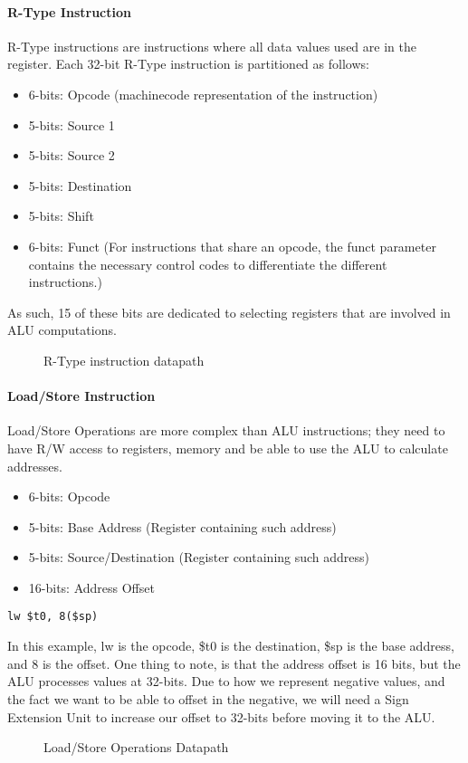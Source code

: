 \paragraph{R-Type Instruction}
R-Type instructions are instructions where all data values used are in the register. Each 32-bit R-Type instruction is partitioned as follows:
\begin{itemize}
	\item 6-bits: Opcode (machinecode representation of the instruction)
	\item 5-bits: Source 1
	\item 5-bits: Source 2
	\item 5-bits: Destination
	\item 5-bits: Shift
	\item 6-bits: Funct (For instructions that share an opcode, the funct parameter contains the necessary control codes to differentiate the different instructions.)
\end{itemize}
As such, 15 of these bits are dedicated to selecting registers that are involved in ALU computations.
\begin{figure}[!htb]
	\caption{\label{fig:rtype} R-Type instruction datapath}
\end{figure}
\newpage
\paragraph{Load/Store Instruction}
Load/Store Operations are more complex than ALU instructions; they need to have R/W access to registers, memory and be able to use the ALU to calculate addresses.
\begin{itemize}
	\item 6-bits: Opcode
	\item 5-bits: Base Address (Register containing such address)
	\item 5-bits: Source/Destination (Register containing such address)
	\item 16-bits: Address Offset
\end{itemize}
\begin{verbatim}
lw $t0, 8($sp)
\end{verbatim}
In this example, lw is the opcode, \$t0 is the destination, \$sp is the base address, and 8 is the offset.
One thing to note, is that the address offset is 16 bits, but the ALU processes values at 32-bits. Due to how we represent negative values, and the fact we want to be able to offset in the negative, we will need a Sign Extension Unit to increase our offset to 32-bits before moving it to the ALU.
\begin{figure}[!htb]
	\caption{\label{fig:loadstore} Load/Store Operations Datapath}
\end{figure}
